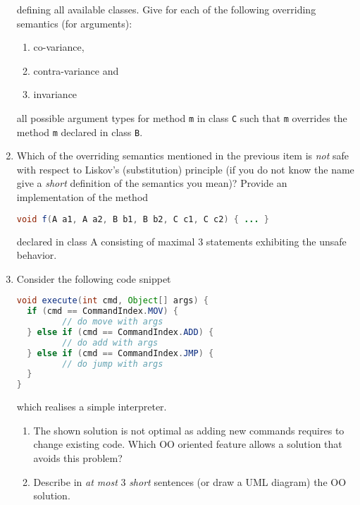 \documentclass{article}
\newcommand{\comment}[1]{\marginpar{#1}}
\begin{document}
\begin{enumerate}
\begin{center}
\end{center}
defining all available classes. 
Give for each of the following overriding semantics (for arguments):
\begin{enumerate}
  \item co-variance,
  \item contra-variance and
  \item invariance
\end{enumerate}
all possible argument types for method \lstinline!m! in class
\lstinline!C! such that \lstinline!m! overrides the method
\lstinline!m! declared in class \lstinline!B!. 
\item \comment{\textbf{ [2 points]}} Which of the overriding
  semantics mentioned in the previous item is \emph{not} safe with
  respect to Liskov's (substitution) principle (if you do not know the
  name give a \emph{short} definition of the semantics you mean)?
  Provide an implementation of the method
\begin{center}
\begin{lstlisting}[language=Java, columns=flexible]
void f(A a1, A a2, B b1, B b2, C c1, C c2) { ... }        
\end{lstlisting}
\end{center}
declared in class A consisting of maximal 3 statements exhibiting the
unsafe behavior.

\item Consider the following code snippet
\begin{lstlisting}[language=Java, columns=flexible]
void execute(int cmd, Object[] args) {
  if (cmd == CommandIndex.MOV) { 
         // do move with args 
  } else if (cmd == CommandIndex.ADD) {
         // do add with args
  } else if (cmd == CommandIndex.JMP) {
         // do jump with args
  }
}
\end{lstlisting}
which realises a simple interpreter. 
\begin{enumerate}
\item \comment{\textbf{[1 point]}} The shown solution is not optimal
  as adding new commands requires to change existing code. Which OO
  oriented feature allows a solution that avoids this problem?
 \item \comment{\textbf{[3 points]}} Describe in \emph{at most} 3
   \emph{short} sentences (or draw a UML diagram) the OO solution. 
\end{enumerate}

\end{enumerate}
\end{document}
